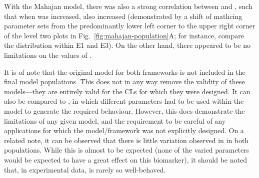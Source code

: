 \documentclass[../thesis-main.tex]{subfiles}
\begin{document}
With the Mahajan model, there was also a strong correlation between \gnak{} and \gks{}, such that when \gnak{} was increased, \gks{} also increased (demonstrated by a shift of mathcing parameter sets from the predominantly lower left corner to the upper right corner of the level two plots in Fig.~\ref{fig:mahajan-population}A; for instance, compare the distribution within E1 and E3). On the other hand, there appeared to be no limitations on the values of \gkr{}.

It is of note that the original model for both frameworks is not included in the final model populations. This does not in any way remove the validity of these models---they are entirely valid for the CLs for which they were designed. It can also be compared to \citet{Sato2009}, in which different parameters had to be used within the model to generate the required behaviour. However, this does demonstrate the limitations of any given model, and the requirement to be careful of any applications for which the model/framework was not explicitly designed. On a related note, it can be observed that there is little variation observed in \vrest{} in both populations. While this is almost to be expected (none of the varied parameters would be expected to have a great effect on this biomarker), it should be noted that, in experimental data, \vrest{} is rarely so well-behaved.
\end{document}

